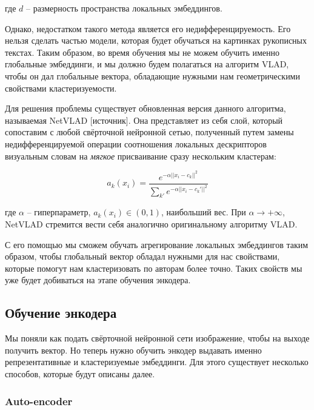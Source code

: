     \noindent
    где $d$ -- размерность пространства локальных эмбеддингов.

    Однако, недостатком такого метода является его недифференцируемость. Его нельзя сделать частью модели, которая будет обучаться на картинках рукописных текстах. Таким образом, во время обучения мы не можем обучить именно глобальные эмбеддинги, и мы должно будем полагаться на алгоритм VLAD, чтобы он дал глобальные вектора, обладающие нужными нам геометрическими свойствами кластеризуемости.
    
    Для решения проблемы существует обновленная версия данного алгоритма, называемая NetVLAD [источник]. Она представляет из себя слой, который сопоставим с любой свёрточной нейронной сетью, полученный путем замены недифференцируемой операции соотношения локальных дескрипторов визуальным словам на \textit{мягкое} присваивание сразу нескольким кластерам:
    
    $$
        a_k(x_i) = \frac{e^{- \alpha || x_i - c_k ||^2}}{\sum_{k'} e^{- \alpha || x_i - c_k' ||^2}}
    $$
    \smallskip

    \noindent
    где $\alpha$ -- гиперпараметр, $a_k(x_i) \in (0, 1)$, наибольший вес. При $\alpha \rightarrow + \infty$, \: NetVLAD стремится вести себя аналогично оригинальному алгоритму VLAD.

    С его помощью мы сможем обучать агрегирование локальных эмбеддингов таким образом, чтобы глобальный вектор обладал нужными для нас свойствами, которые помогут нам кластеризовать по авторам более точно. Таких свойств мы уже будет добиваться на этапе обучения энкодера.

\subsection{Обучение энкодера}

    Мы поняли как подать свёрточной нейронной сети изображение, чтобы на выходе получить вектор. Но теперь нужно обучить энкодер выдавать именно репрезентативные и кластеризуемые эмбеддинги. Для этого существует несколько способов, которые будут описаны далее.

\subsubsection{Auto-encoder}

